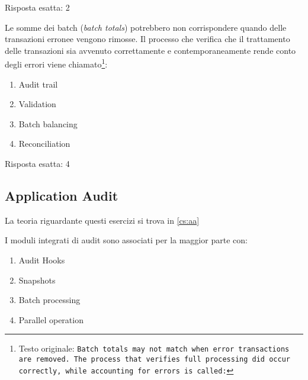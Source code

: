\begin{Answer} [
  ref={esCs2},
  number={2}
  ]

  \Question Risposta esatta: 2
\end{Answer}

\begin{Exercise} [
  title={Quiz},
  label={esCs3}
  ]

  \Question Le somme dei batch (\textit{batch totals}) potrebbero non 
corrispondere quando delle transazioni erronee vengono rimosse. 
Il processo che verifica che il trattamento delle transazioni sia
avvenuto correttamente e contemporaneamente rende conto degli errori 
viene chiamato\footnote{Testo originale: \texttt{Batch totals may not
match when error transactions are removed. The process that verifies 
full processing did occur correctly, while accounting for errors is
called:}}:

\begin{enumerate}
\item Audit trail
\item Validation
\item Batch balancing
\item Reconciliation
\end{enumerate}


\end{Exercise}

\begin{Answer} [
  ref={esCs3},
  number={3}
  ]

  \Question Risposta esatta: 4
\end{Answer}


\subsection{Application Audit}
\label{esCs:aa}

La teoria riguardante questi esercizi si trova in \ref{cs:aa}


\begin{Exercise} [
  title={Quiz},
  label={esCs4}
  ]

  \Question I moduli integrati di audit sono associati per la maggior parte con:
\begin{enumerate}
\item Audit Hooks
\item Snapshots
\item Batch processing
\item Parallel operation
\end{enumerate}



\end{Exercise}

